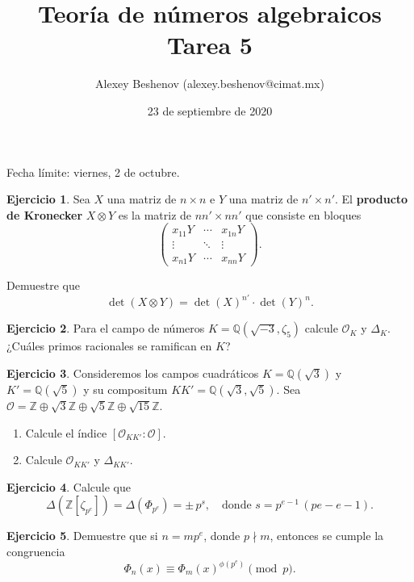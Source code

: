 \documentclass{article}
\title{Teoría de números algebraicos\\Tarea 5}
\author{Alexey Beshenov (alexey.beshenov@cimat.mx)}
\date{23 de septiembre de 2020}
\newcounter{tarea}
\theoremstyle{definition}
\newtheorem{ejercicio}{Ejercicio}[tarea]
\newcommand{\ZZ}{\mathbb{Z}}
\newcommand{\QQ}{\mathbb{Q}}
\renewcommand{\O}{\mathcal{O}}
\begin{document}
{\sffamily\bfseries\maketitle}

\noindent Fecha límite: viernes, 2 de octubre.

\ifdefined\solutions
\else
\thispagestyle{empty}
\fi

\vspace{1em}

\begin{ejercicio}
  Sea $X$ una matriz de $n\times n$ e $Y$ una matriz de $n'\times n'$.
  El \textbf{producto de Kronecker} $X\otimes Y$ es la matriz de
  $nn' \times nn'$ que consiste en bloques
  \[ \begin{pmatrix}
    x_{11} Y & \cdots & x_{1n} Y \\
    \vdots & \ddots & \vdots \\
    x_{n1} Y & \cdots & x_{nn} Y
  \end{pmatrix}. \]

  Demuestre que
  $$\det (X\otimes Y) = \det (X)^{n'} \cdot \det (Y)^n.$$
\end{ejercicio}

\begin{ejercicio}
  Para el campo de números $K = \QQ (\sqrt{-3},\zeta_5)$ calcule
  $\O_K$ y $\Delta_K$. ¿Cuáles primos racionales se ramifican en $K$?
\end{ejercicio}

\begin{ejercicio}
  Consideremos los campos cuadráticos $K = \QQ (\sqrt{3})$ y
  $K' = \QQ (\sqrt{5})$ y su compositum $KK' = \QQ (\sqrt{3},\sqrt{5})$.
  Sea $\O = \ZZ \oplus \sqrt{3}\ZZ \oplus \sqrt{5}\ZZ \oplus \sqrt{15}\ZZ$.

  \begin{enumerate}
  \item[1)] Calcule el índice $[\O_{KK'} : \O]$.

  \item[2)] Calcule $\O_{KK'}$ y $\Delta_{KK'}$.
  \end{enumerate}
\end{ejercicio}

\begin{ejercicio}
  Calcule que
  \[ \Delta (\ZZ [\zeta_{p^e}]) = \Delta (\Phi_{p^e}) = \pm\,p^s,
     \quad \text{donde } s = p^{e-1}\,(pe - e - 1). \]
\end{ejercicio}

\begin{ejercicio}
  Demuestre que si $n = m p^e$, donde $p \nmid m$, entonces se cumple
  la congruencia
  $$\Phi_n (x) \equiv \Phi_m (x)^{\phi (p^e)} \pmod{p}.$$
\end{ejercicio}
\end{document}
